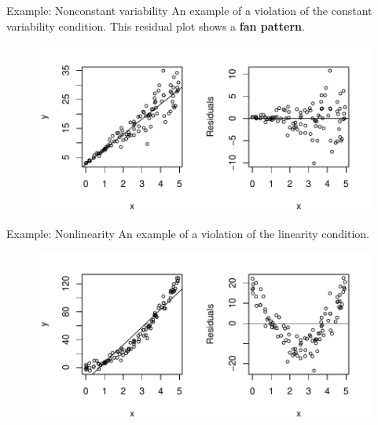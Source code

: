 \documentclass[11pt]{beamer}\usepackage[]{graphicx}\usepackage[]{color}
\begin{document}
\begin{frame}{Example: Nonconstant variability}
An example of a violation of the constant variability condition. This residual plot shows a \textbf{fan pattern}.
\begin{figure}
\includegraphics[scale=0.65]{figure/resid_var.pdf}
\end{figure}
\end{frame}

\begin{frame}{Example: Nonlinearity}
An example of a violation of the linearity condition.
\begin{figure}
\includegraphics[scale=0.65]{figure/resid_nonlin.pdf}
\end{figure}
\end{frame}

\end{document}
